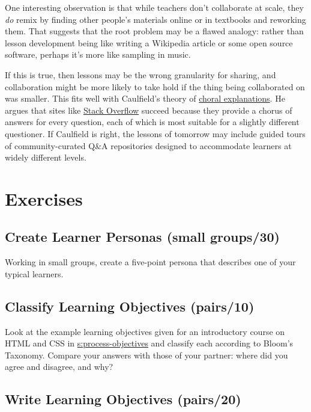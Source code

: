 One interesting observation is that while teachers don't collaborate
at scale, they \emph{do} remix by finding other people's materials online
or in textbooks and reworking them. That suggests that the root
problem may be a flawed analogy: rather than lesson development being
like writing a Wikipedia article or some open source software, perhaps
it's more like sampling in music.

If this is true, then lessons may be the wrong granularity for
sharing, and collaboration might be more likely to take hold if the
thing being collaborated on was smaller. This fits well with
Caulfield's theory of \href{https://hapgood.us/2016/05/13/choral-explanations/}{choral explanations}. He
argues that sites like \href{https://stackoverflow.com/}{Stack Overflow} succeed
because they provide a chorus of answers for every question, each of
which is most suitable for a slightly different questioner. If
Caulfield is right, the lessons of tomorrow may include guided tours
of community-curated Q\&A repositories designed to accommodate learners
at widely different levels.

\section{Exercises}\label{s:process-exercises}

\subsection{Create Learner Personas (small groups/30)}\label{create-learner-personas-small-groups30}

Working in small groups, create a five-point persona that describes one
of your typical learners.

\subsection{Classify Learning Objectives (pairs/10)}\label{classify-learning-objectives-pairs10}

Look at the example learning objectives given for an introductory course
on HTML and CSS in \protect\hyperlink{SECTION}{s:process-objectives} and classify each
according to Bloom's Taxonomy. Compare your answers with those of your
partner: where did you agree and disagree, and why?

\subsection{Write Learning Objectives (pairs/20)}\label{write-learning-objectives-pairs20}

